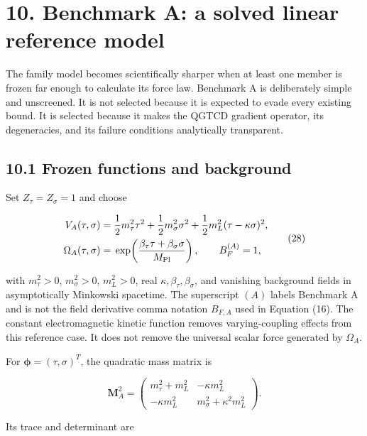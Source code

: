 \documentclass[
  american,
  11pt,
  letterpaper,
]{article}
\begin{document}
\section{10. Benchmark A: a solved linear reference model}\label{benchmark-a-a-solved-linear-reference-model}

The family model becomes scientifically sharper when at least one member is frozen far enough to calculate its force law. Benchmark A is deliberately simple and unscreened. It is not selected because it is expected to evade every existing bound. It is selected because it makes the QGTCD gradient operator, its degeneracies, and its failure conditions analytically transparent.

\subsection{10.1 Frozen functions and background}\label{frozen-functions-and-background}

Set \(Z_\tau=Z_\sigma=1\) and choose

\[
\begin{aligned}
V_A(\tau,\sigma)={}&
\frac12m_\tau^2\tau^2+\frac12m_\sigma^2\sigma^2
+\frac12m_L^2(\tau-\kappa\sigma)^2,\\
\Omega_A(\tau,\sigma)={}&
\exp\!\left(\frac{\beta_\tau\tau+\beta_\sigma\sigma}{M_{\rm Pl}}\right),
\qquad B_F^{(A)}=1 ,
\end{aligned} \tag{28}
\]

with \(m_\tau^2>0\), \(m_\sigma^2>0\), \(m_L^2>0\), real \(\kappa,\beta_\tau,\beta_\sigma\), and vanishing background fields in asymptotically Minkowski spacetime. The superscript \((A)\) labels Benchmark A and is not the field derivative comma notation \(B_{F,A}\) used in Equation (16). The constant electromagnetic kinetic function removes varying-coupling effects from this reference case. It does not remove the universal scalar force generated by \(\Omega_A\).

For \(\boldsymbol\phi=(\tau,\sigma)^T\), the quadratic mass matrix is

\begin{equation}
\mathbf M_A^2=
\begin{pmatrix}
m_\tau^2+m_L^2 & -\kappa m_L^2\\
-\kappa m_L^2 & m_\sigma^2+\kappa^2m_L^2
\end{pmatrix}.
\tag{29}
\end{equation}

Its trace and determinant are
\end{document}
